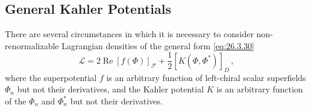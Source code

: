 
\subsection[General Kahler Potentials]{General Kahler Potentials\footnotemark}

There are several circumstances in which it is necessary to consider
non-renormalizable Lagrangian densities of the general form
\eqref{eq:26.3.30}
\begin{equation}
  \mathcal{L}
  =2\operatorname{Re}[f(\Phi)]_{\mathcal{F}}
  +\frac12[K(\Phi,\Phi^*)]_D\,,
  \tag{26.8.1}\label{eq:26.8.1}
\end{equation}
where the superpotential \(f\) is an arbitrary function of left-chiral scalar
superfields \(\Phi_n\) but not their derivatives, and the Kahler potential
\(K\) is an arbitrary function of the \(\Phi_n\) and \(\Phi_n^*\) but not
their derivatives.

